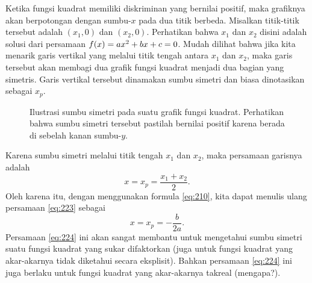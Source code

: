 	\par Ketika fungsi kuadrat memiliki diskriminan yang bernilai positif, maka grafiknya akan berpotongan dengan sumbu-$ x $ pada dua titik berbeda. Misalkan titik-titik tersebut adalah $ \left(x_{1}, 0\right) $ dan $ \left(x_{2}, 0\right) $. Perhatikan bahwa $ x_{1} $ dan $ x_{2} $ disini adalah solusi dari persamaan $ \mathop{}\!{f}{\left({x}\right)} = ax^{2} + bx + c = 0 $. Mudah dilihat bahwa jika kita menarik garis vertikal yang melalui titik tengah antara $ x_{1} $ dan $ x_{2} $, maka garis tersebut akan membagi dua grafik fungsi kuadrat menjadi dua bagian yang simetris. Garis vertikal tersebut dinamakan sumbu simetri dan biasa dinotasikan sebagai $ x_{p} $.
	\begin{figure}[H]
		\centering
		\caption{Ilustrasi sumbu simetri pada suatu grafik fungsi kuadrat. Perhatikan bahwa sumbu simetri tersebut pastilah bernilai positif karena berada di sebelah kanan sumbu-$ y $.}
	\end{figure}
	Karena sumbu simetri melalui titik tengah $ x_{1} $ dan $ x_{2} $, maka persamaan garisnya adalah
	\begin{equation} \label{eq:223}
		x = x_{p} = \frac{x_{1} + x_{2}}{2}.
	\end{equation}
	Oleh karena itu, dengan menggunakan formula \ref{eq:210}, kita dapat menulis ulang persamaan \ref{eq:223} sebagai
	\begin{equation} \label{eq:224}
		x = x_{p} = -\frac{b}{2a}.
	\end{equation}
	Persamaan \ref{eq:224} ini akan sangat membantu untuk mengetahui sumbu simetri suatu fungsi kuadrat yang sukar difaktorkan (juga untuk fungsi kuadrat yang akar-akarnya tidak diketahui secara eksplisit). Bahkan persamaan \ref{eq:224} ini juga berlaku untuk fungsi kuadrat yang akar-akarnya takreal (mengapa?).
	
